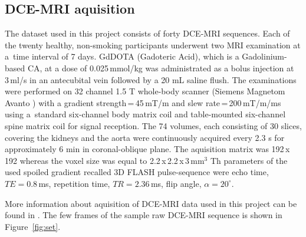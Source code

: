 \subsection{DCE-MRI aquisition}
The dataset used in this project consists of forty DCE-MRI sequences. Each of the twenty healthy, non-smoking participants underwent two MRI examination at a~time interval of 7 days.
GdDOTA (Gadoteric Acid), which is a Gadolinium-based CA,  at a dose of 0.025\,mmol/kg was administrated as a bolus injection at 3\,ml/s in an antecubital vein followed by a 20 mL saline flush.
The examinations were performed on 32 channel 1.5 T whole-body scanner (Siemens Magnetom Avanto \cite{simens}) with a gradient strength\,=\,45\,mT/m and slew rate\,=\,200\,mT/m/ms using a~standard six-channel body matrix coil and table-mounted six-channel spine matrix coil for signal reception.
The 74 volumes, each consisting of 30 slices, covering the kidneys and the aorta were continuously acquired every 2.3 s for approximately 6 min in coronal-oblique plane.
The aquisition matrix was 192\,x\,192 whereas the voxel size was equal to 2.2\,x\,2.2\,x\,3\,mm$^3$
Th parameters of the used spoiled gradient recalled 3D FLASH pulse-sequence were echo time, $TE=0.8$\,ms, repetition time, $TR=2.36$\,ms, flip angle, $\alpha= 20^{\circ}$.

More information about aquisition of DCE-MRI data used in this project can be found in \cite{eikefjord2017dynamic}.
The few frames of the sample raw DCE-MRI sequence is shown in Figure~\ref{fig:set}.
\newpage



